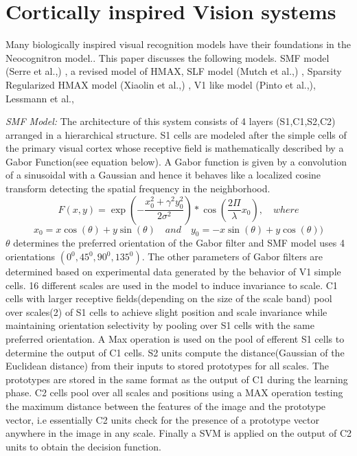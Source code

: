 \documentclass[12pt,twoside]{article}
\theoremstyle{plain}
\theoremstyle{definition}
\theoremstyle{remark}
\begin{document}
\section{Cortically inspired Vision systems}
\label{sec:corticalmodels}
Many biologically inspired visual recognition models have their foundations in the Neocognitron model.\cite{Fukushim1980}. This paper discusses the following models. SMF model (Serre et al.,) \cite{ThomasSerre2007}, a revised model of HMAX\cite{MaximilianRiesenhuber1999}, SLF model (Mutch et al.,) \cite{JimMutch2008}, Sparsity Regularized HMAX model (Xiaolin et al.,) \cite{XiaolinHu2014}, V1 like model (Pinto et al.,)\cite{NicolasPinto2008}, Lessmann et al., \cite{MarkusLessmann2014}

\textit{SMF Model: }The architecture of this system consists of 4 layers (S1,C1,S2,C2) arranged in a hierarchical structure. S1 cells are modeled after the simple cells of the primary visual cortex whose receptive field is mathematically described\cite{JPJones1987} by a Gabor Function(see equation below)\cite{Gabor1946}. A Gabor function is given by a convolution of a sinusoidal with a Gaussian and hence it behaves like a localized cosine transform detecting the spatial frequency in the neighborhood. 
\begin{equation}\label{eq:Gabor}
F(x,y) = \exp(-\frac{x_0^2 + \gamma^2y_0^2}{2\sigma^2})*\cos(\frac{2\Pi}{\lambda}x_0), \quad where 
\end{equation}
\begin{equation}\label{eq:Gabor_or}
x_0 = x\cos(\theta)+y\sin(\theta) \quad and \quad y_0 = -x\sin(\theta) + y\cos(\theta))
\end{equation}
$\theta $ determines the preferred orientation of the Gabor filter and SMF model uses 4 orientations $(0^0,45^0,90^0,135^0)$. The other parameters of Gabor filters are determined based on experimental data generated by the behavior of V1 simple cells\cite{ThomasSerre2004}. 16 different scales are used in the model to induce invariance to scale. C1 cells with larger receptive fields(depending on the size of the scale band)\cite{ThomasSerre2007} pool over scales(2) of S1 cells to achieve slight position and scale invariance while maintaining orientation selectivity by pooling over S1 cells with the same preferred orientation. A Max operation is used on the pool of efferent S1 cells to determine the output of C1 cells. S2 units compute the distance(Gaussian of the Euclidean distance) from their inputs to stored prototypes for all scales. The prototypes are stored in the same format as the output of C1 during the learning phase. C2 cells pool over all scales and positions using a MAX operation testing the maximum distance between the features of the image and the prototype vector, i.e essentially C2 units check for the presence of a prototype vector anywhere in the image in any scale. Finally a SVM is applied on the output of C2 units to obtain the decision function. \\\\
\end{document}
